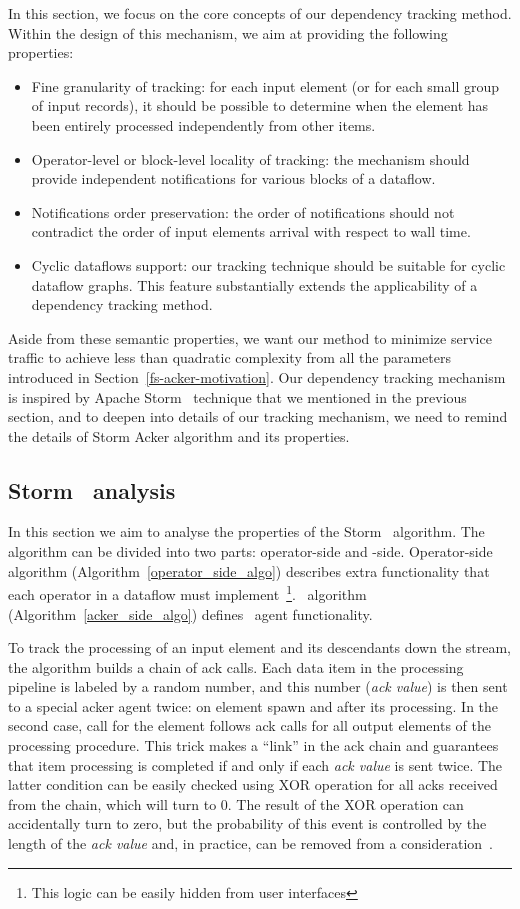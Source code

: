 In this section, we focus on the core concepts of our dependency tracking method. Within the design of this mechanism, we aim at providing the following properties:
\begin{itemize}
    \item Fine granularity of tracking: for each input element (or for each small group of input records), it should be possible to determine when the element has been entirely processed independently from other items.
    \item Operator-level or block-level locality of tracking: the mechanism should provide independent notifications for various blocks of a dataflow.
    \item Notifications order preservation: the order of notifications should not contradict the order of input elements arrival with respect to wall time.
    \item Cyclic dataflows support: our tracking technique should be suitable for cyclic dataflow graphs. This feature substantially extends the applicability of a dependency tracking method.
\end{itemize}
Aside from these semantic properties, we want our method to minimize service traffic to achieve less than quadratic complexity from all the parameters introduced in Section~\ref{fs-acker-motivation}.
Our dependency tracking mechanism is inspired by Apache Storm \acker\ technique that we mentioned in the previous section, and to deepen into details of our tracking mechanism, we need to remind the details of Storm Acker algorithm and its properties. 

\subsection{Storm \acker~analysis}
\label{sec:acker-analysis}
In this section we aim to analyse the properties of the Storm \acker\ algorithm. The algorithm can be divided into two parts: operator-side and \acker -side. Operator-side algorithm (Algorithm~\ref{operator_side_algo}) describes extra functionality that each operator in a dataflow must implement~\footnote{This logic can be easily hidden from user interfaces}. \acker\ algorithm (Algorithm~\ref{acker_side_algo}) defines \acker\ agent functionality.

To track the processing of an input element and its descendants down the stream, the algorithm builds a chain of ack calls. Each data item in the processing pipeline is labeled by a random number, and this number (\textit{ack value}) is then sent to a special acker agent twice: on element spawn and after its processing. In the second case, call for the element follows ack calls for all output elements of the processing procedure. This trick makes a ``link'' in the ack chain and guarantees that item processing is completed if and only if each \textit{ack value} is sent twice. The latter condition can be easily checked using XOR operation for all acks received from the chain, which will turn to 0. The result of the XOR operation can accidentally turn to zero, but the probability of this event is controlled by the length of the \textit{ack value} and, in practice, can be removed from a consideration~\cite{apache:storm:acker}.

